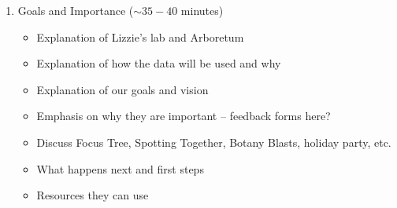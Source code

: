 \documentclass{article}\usepackage[]{graphicx}\usepackage[]{color}
\begin{document}
\begin{enumerate}
  \item Goals and Importance ($\sim 35-40$ minutes)
  \begin{itemize}
    \item Explanation of Lizzie's lab and Arboretum
    \item Explanation of how the data will be used and why
    \item Explanation of our goals and vision
    \item Emphasis on why they are important -- feedback forms here?
    \item Discuss Focus Tree, Spotting Together, Botany Blasts, holiday party, etc.
    \item What happens next and first steps
    \item Resources they can use
  \end{itemize}
\end{enumerate}
    
\end{document}
